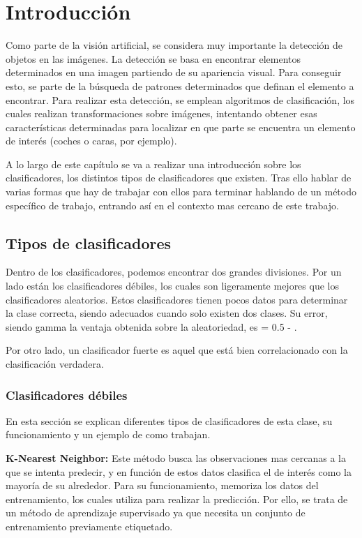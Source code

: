 \chapter{Introducci\'on}\label{cap.introduccion}
\hspace{1 cm} Como parte de la visión artificial, se considera muy importante la detección de objetos en las imágenes. La detección se basa en encontrar elementos determinados en una imagen partiendo de su apariencia visual. Para conseguir esto, se parte de la búsqueda de patrones determinados que definan el elemento a encontrar. Para realizar esta detección, se emplean algoritmos de clasificación, los cuales realizan transformaciones sobre imágenes, intentando obtener esas características determinadas para localizar en que parte se encuentra un elemento de interés (coches o caras, por ejemplo).

A lo largo de este capítulo se va a realizar una introducción sobre los clasificadores, los distintos tipos de clasificadores que existen. Tras ello hablar de varias formas que hay de trabajar con ellos para terminar hablando de un método específico de trabajo, entrando así en el contexto mas cercano de este trabajo.

 
\section{Tipos de clasificadores}

Dentro de los clasificadores, podemos encontrar dos grandes divisiones. Por un lado están los clasificadores débiles, los cuales son ligeramente mejores que los clasificadores aleatorios. Estos clasificadores tienen pocos datos para determinar la clase correcta, siendo adecuados cuando solo existen dos clases. Su error, siendo gamma la ventaja obtenida sobre la aleatoriedad, es \varepsilon = 0.5 - \gamma . 

Por otro lado, un clasificador fuerte es aquel que está bien correlacionado con la clasificación verdadera.

\subsection{Clasificadores débiles}
En esta sección se explican diferentes tipos de clasificadores de esta clase, su funcionamiento y un ejemplo de como trabajan.

\textbf{K-Nearest Neighbor:} Este método busca las observaciones mas cercanas a la que se intenta predecir, y en función de estos datos clasifica el de interés como la mayoría de su alrededor. 
Para su funcionamiento, memoriza los datos del entrenamiento, los cuales utiliza para realizar la predicción. Por ello, se trata de un método de aprendizaje supervisado ya que necesita un conjunto de entrenamiento previamente etiquetado. 

